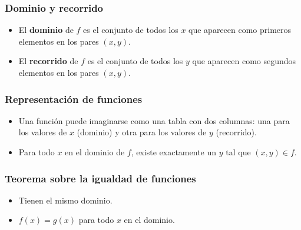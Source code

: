 \subsubsection*{Dominio y recorrido}
\begin{itemize}
    \item El \textbf{dominio} de \( f \) es el conjunto de todos los \( x \) que aparecen como primeros elementos en los pares \( (x,y) \).
    \item El \textbf{recorrido} de \( f \) es el conjunto de todos los \( y \) que aparecen como segundos elementos en los pares \( (x,y) \).
\end{itemize}

\subsubsection*{Representación de funciones}
\begin{itemize}
    \item Una función puede imaginarse como una tabla con dos columnas: una para los valores de \( x \) (dominio) y otra para los valores de \( y \) (recorrido).
    \item Para todo \( x \) en el dominio de \( f \), existe exactamente un \( y \) tal que \( (x,y) \in f \).
\end{itemize}

\subsubsection*{Teorema sobre la igualdad de funciones}
\begin{itemize}
    \item Tienen el mismo dominio.
    \item \( f(x) = g(x) \) para todo \( x \) en el dominio.
\end{itemize}
